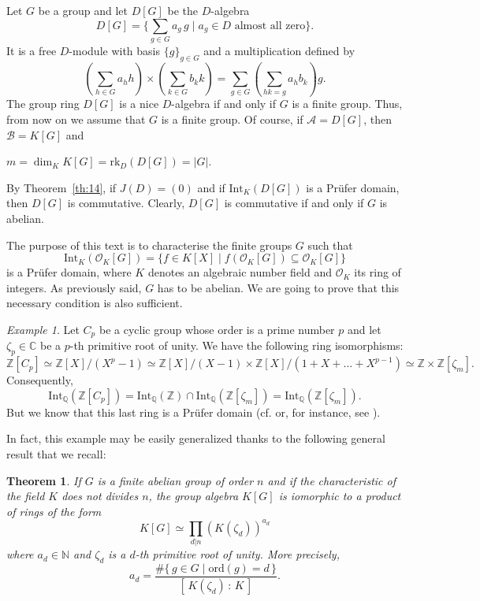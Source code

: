 \documentclass{amsart}
\newtheorem{theorem}[lemma]{Theorem}
\newtheorem{first argument}[lemma]{First Argument}
\theoremstyle{definition}
\theoremstyle{definitions}
\theoremstyle{remark}
\newtheorem{example}[lemma]{Example}
\theoremstyle{remark}
\def\SC{\mathbb C}    %
\def\SN{\mathbb N}    %
\def\SQ{\mathbb Q}    %
\def\SZ{\mathbb Z}    %
\def\Aa{{\mathcal A}}           %
\def\Bb{{\mathcal B}}           %
\def\Oo{{\mathcal O}}           %
\def\int{\mathrm{Int}}         %
\begin{document}
Let $G$ be a group and let $D[G]$ be the $D$-algebra  
$$D[G]=\{\sum_{g\in G}a_g\,g\;\big\vert \; a_g\in D \textrm{  almost all zero} \}.$$ 
It is a free $D$-module with basis $\{g\}_{g\in G}$ and a multiplication defined by $$\left(\sum_{h\in G}a_hh\right)\times\left(\sum_{k\in G}b_kk\right)=\sum_{g\in G}\left(\sum_{hk=g}a_hb_k\right)g.$$
The group ring  $D[G]$ is a nice $D$-algebra if and only if $G$ is a finite group. Thus, from now on we assume that $G$ is a finite group. Of course, if $\Aa=D[G]$, then $\Bb=K[G]$ and 

\centerline{$m=\dim_K K[G]=\mathrm{rk}_D (D[G])=\vert G\vert$.}

\smallskip

\noindent By Theorem~\ref{th:14}, if $J(D)=(0)$ and if $\int_K(D[G])$ is a Pr\"ufer domain, then $D[G]$ is commutative. Clearly, $D[G]$ is commutative if and only if $G$ is abelian.

\medskip

The purpose of this text is to characterise the finite groups $G$ such that 
$$\int_{K}(\Oo_K[G])=\{f\in K[X]\mid f(\Oo_K[G])\subseteq \Oo_K[G]\}$$
is a Pr\"ufer domain, where $K$ denotes an algebraic number field and $\Oo_K$ its ring of integers. As previously said, $G$ has to be abelian. We are going to prove that this necessary condition is also sufficient.

\begin{example}
Let $C_p$ be a cyclic group whose order is a prime number $p$ and let $\zeta_p\in\SC$ be a $p$-th primitive root of unity. We have the following ring isomorphisms:
$$\SZ[C_p]\simeq \SZ[X]/(X^p-1)\simeq\SZ[X]/(X-1)\times\SZ[X]/(1+X+\ldots+X^{p-1})\simeq\SZ\times\SZ[\zeta_m].$$
Consequently, 
$$\int_{\SQ}(\SZ[C_p])=\int_{\SQ}(\SZ)\cap\int_{\SQ}(\SZ[\zeta_m])=\int_{\SQ}(\SZ[\zeta_m]).$$
But we know that this last ring is a Pr\"ufer domain (cf. \cite{bib:LW2012} or, for instance, see \cite[Corollary VIII.60]{bib:C2}).
\end{example}

In fact, this example may be easily generalized thanks to the following general result that we recall:
  
\begin{theorem}\cite[Theorem 1]{bib:PW1950}\label{thm:2.6}
If $G$ is a finite abelian group of order $n$ and if the characteristic of the field $K$ does not divides $n$, the group algebra $K[G]$ is iomorphic to a product of rings of the form
$$K[G]\simeq \prod_{d\vert n}(K(\zeta_d))^{a_d}$$ 
where $a_d\in\SN$  and $\zeta_d$ is a $d$-th primitive root of unity. More precisely, 
$$a_d=\frac{\#\{\,g\in G \mid \textrm{ord}(g)=d\,\}}{[\,K(\zeta_d)\,:\,K\,]}.$$
\end{theorem}
\end{document}
